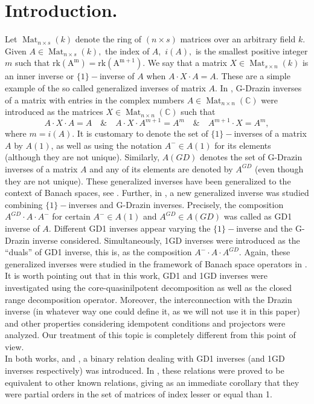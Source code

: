 \documentclass[10pt,a4paper]{amsart}
\theoremstyle{plain}
\theoremstyle{remark}
\numberwithin{equation}{section} \numberwithin{defn}{section}
\newcommand{\Mat}{\operatorname{Mat}}
\newcommand{\C}{\mathbb{C}}
\begin{document}
\section{Introduction.}

Let $\Mat_{n\times s}(k)$ denote the ring of $(n \times s)$ matrices over an arbitrary field $k.$ Given $A\in \Mat_{n\times s}(k),$ the index of $A,$ $i(A),$ is the smallest positive integer $m$ such that $\mathrm{rk (A^m)}=\mathrm{rk(A^{m+1})}.$ We say that a matrix $X\in \Mat_{s\times n}(k)$ is an inner inverse or $\{1\}-$inverse of $A$ when $A\cdot X\cdot A=A.$ These are a simple example of the so called generalized inverses of matrix $A.$ In \cite{GDraz}, G-Drazin inverses of a matrix with entries in the complex numbers $A\in \Mat_{n\times n}(\C)$ were introduced as the matrices $X\in \Mat_{n\times n}(\C)$ such that $$A\cdot X \cdot A=A \quad \& \quad A\cdot X\cdot A^{m+1}=A^m \quad \& \quad A^{m+1}\cdot X=A^m, $$ where $m=i(A).$ It is customary to denote the set of $\{1\}-$inverses of a matrix $A$ by $A(1)$, as well as using the notation $A^-\in A(1)$ for its elements (although they are not unique). Similarly, $A(GD)$ denotes the set of G-Drazin inverses of a matrix $A$ and any of its elements are denoted by $A^{GD}$ (even though they are not unique). These generalized inverses have been generalized to the context of Banach spaces, see \cite{GMos}. Further, in \cite{GD1N}, a new generalized inverse was studied combining $\{1\}-$inverses and G-Drazin inverses. Precisely, the composition $A^{GD} \cdot A \cdot A^-$ for certain $A^- \in A(1)$ and $A^{GD}\in A(GD)$ was called as GD1 inverse of $A.$ Different GD1 inverses appear varying the $\{1\}-$inverse and the G-Drazin inverse considered. Simultaneously, 1GD inverses were introduced as the ``duals'' of GD1 inverse, this is, as the composition $A^-\cdot A \cdot A^{GD}.$ Again, these generalized inverses were studied in the framework of Banach space operators in \cite{sahoo}. It is worth pointing out that in this work, GD1 and 1GD inverses were investigated using the core-quasinilpotent decomposition as well as the closed range decomposition operator. Moreover, the interconnection with the Drazin inverse (in whatever way one could define it, as we will not use it in this paper) and other properties considering idempotent conditions and projectors were analyzed. Our treatment of this topic is completely different from this point of view.\\In both works, \cite{GD1N} and \cite{sahoo}, a binary relation dealing with GD1 inverses (and 1GD inverses respectively) was introduced. In \cite[Theorem 2.14, Theorem 3.14]{GD1N}, these relations were proved to be equivalent to other known relations, giving as an immediate corollary that they were partial orders in the set of matrices of index lesser or equal than 1.\\
\end{document}

